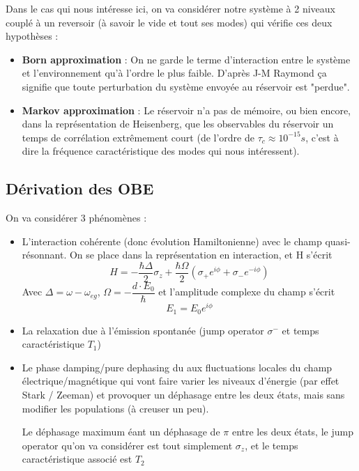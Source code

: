 \documentclass[a4paper]{report}
\begin{document}
   Dans le cas qui nous intéresse ici, on va considérer notre système à 2 niveaux couplé à un reversoir (à savoir le vide et tout ses modes) qui vérifie ces deux hypothèses :\begin{itemize}
   \item \textbf{Born approximation} : On ne garde le terme d'interaction entre le système et l'environnement qu'à l'ordre le plus faible. D'après J-M Raymond ça signifie que toute perturbation du système envoyée au réservoir est "perdue".
   \item \textbf{Markov approximation} : Le réservoir n'a pas de mémoire, ou bien encore, dans la représentation de Heisenberg, que les observables du réservoir un temps de corrélation extrêmement court (de l'ordre de $\tau_c \approx 10^{-15} s$, c'est à dire la fréquence caractéristique des modes qui nous intéressent).
   \end{itemize}
   \subsection{Dérivation des OBE}
   On va considérer 3 phénomènes : \begin{itemize}
   \item L’interaction cohérente (donc évolution Hamiltonienne) avec le champ quasi-résonnant. On se place dans la représentation en interaction, et H s'écrit \begin{equation}
   H=-\dfrac{\hbar \Delta }{2} \sigma_z + \dfrac{\hbar \Omega}{2} \left( \sigma_+ e^{i\phi} + \sigma_- e^{-i\phi} \right)
   \end{equation}
   Avec $\Delta = \omega - \omega_{eg}$, $\Omega = -\dfrac{d\cdot E_0}{\hbar}$ et l'amplitude complexe du champ s'écrit  \begin{equation}
   E_1=E_0 e^{i\phi}
   \end{equation}
   \item La relaxation due à l'émission spontanée (jump operator $\sigma^-$ et temps caractéristique $T_1$)
   \item Le phase damping/pure dephasing du aux fluctuations locales du champ électrique/magnétique qui vont faire varier les niveaux d'énergie (par effet Stark / Zeeman) et provoquer un déphasage entre les deux états, mais sans modifier les populations (à creuser un peu).
   
   Le déphasage maximum éant un déphasage de $\pi$ entre les deux états, le jump operator qu'on va considérer est tout simplement $\sigma_z$, et le temps caractéristique associé est $T_2$
\end{itemize}      
\end{document}
